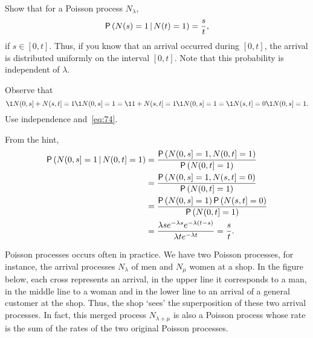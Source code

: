 \begin{exercise}{\faCalculator}
Show that  for a Poisson process $N_\lambda$, 
\begin{equation*}
\P{N(s) =1\given N(t)=1} = \frac s t,
\end{equation*}
if $s\in[0,t]$. Thus, if you know that an arrival occurred during $[0,t]$, the arrival is distributed
uniformly on the interval $[0,t]$. Note that this probability is independent of $\lambda$. 
\begin{hint}
 Observe that 
  \begin{equation*}
\1{N(0,s]+N(s,t]=1}\1{N(0,s]=1} = \1{1+N(s,t]=1}\1{N(0,s]=1}=\1{N(s,t]=0}\1{N(0,s]=1}.
  \end{equation*}
Use  independence and~\eqref{eq:74}.
\end{hint}
\begin{solution}
From the hint,
\begin{align*}
  \P{N(0,s] =1\given N(0,t]=1} 
&= \frac{\P{N(0,s] =1, N(0,t]=1}}{\P{N(0,t]=1}} \\
&= \frac{\P{N(0,s] =1, N(s,t]=0}}{\P{N(0,t]=1}} \\
&= \frac{\P{N(0,s] =1}\P{N(s,t]=0}}{\P{N(0,t]=1}} \\
&= \frac{\lambda s e^{-\lambda s} e^{-\lambda (t-s)}}{\lambda t e^{-\lambda t}} = \frac s t.
\end{align*}
\end{solution}
\end{exercise}

 


 Poisson processes occurs often in practice.
We have two Poisson processes, for instance, the arrival processes $N_\lambda$ of men and $N_\mu$ women at a shop.
In the figure below, each cross represents an arrival, in the upper line it corresponds to a man, in the middle line to a woman and in the lower line to an arrival of a general customer at the shop.
Thus, the shop `sees' the superposition of these two arrival processes.
In fact, this merged process $N_{\lambda+\mu}$ is also a Poisson process whose rate is the sum of the rates of the two original Poisson processes.


